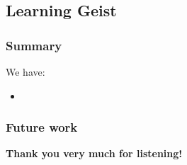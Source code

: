 \documentclass[xcolor=x11names,compress]{beamer}
\renewcommand{\(}{\begin{columns}}
\renewcommand{\)}{\end{columns}}
\newcommand{\<}[1]{\begin{column}{#1}}
\renewcommand{\>}{\end{column}}
\begin{document}
\subsection{Learning Geist}
\begin{frame}
\frametitle{}




\end{frame}




\begin{frame}
\frametitle{Summary}

We have:
\begin{itemize}
\item{}
\end{itemize}

\end{frame}

\begin{frame}
\frametitle{Future work}

\begin{center}
\textbf{Thank you very much for listening!}
\end{center}

\end{frame}
\end{document}
